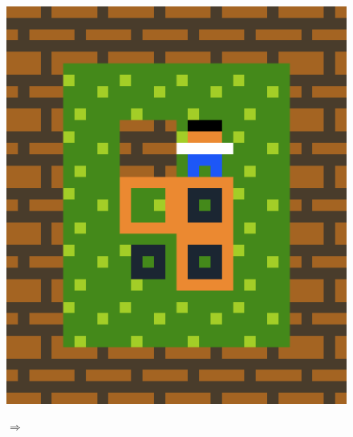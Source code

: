 



\begin{figure}[!htbp]
\centering
\begin{minipage}[t]{0.2\textwidth}
\includegraphics[width=\textwidth]{figures/sokobaniteratelevel.png} \hfill \\
\end{minipage}
$\Longrightarrow$
\begin{minipage}[t]{0.2\textwidth}

\end{minipage}
\end{figure}
